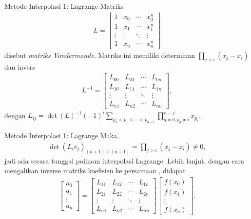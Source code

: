 \documentclass[xcolor={dvipsnames}, 9pt]{beamer}
\begin{document}
    \begin{frame}{Metode Interpolasi 1: Lagrange}
        Matriks
        \begin{align*}
            L =
            \begin{bmatrix}
                1 & x_0 & \cdots & x_0^n \\
                1 & x_1 & \cdots & x_1^n \\
                \vdots & \vdots & \ddots & \vdots \\
                1 & x_n & \cdots & x_n^n
            \end{bmatrix}
        \end{align*}
        disebut \emph{matriks Vandermonde}. Matriks ini memiliki determinan $\prod_{j>i}(x_j-x_i)$ dan invers
        \begin{align*}
            L^{-1} =  
            \begin{bmatrix}
                L_{00} & L_{01} & \cdots & L_{0n} \\
                L_{10} & L_{11} & \cdots & L_{1n} \\
                \vdots & \vdots & \ddots & \vdots \\
                L_{n1} & L_{n2} & \cdots & L_{nn}
            \end{bmatrix},
        \end{align*}
        dengan $L_{ij} = \det(L)^{-1}(-1)^{i}\sum_{p_0<p_1<\cdots<p_{n-i}}\prod_{q=0,p_q\neq i}^{n-j}x_{p_i}$.
    \end{frame}
    \begin{frame}{Metode Interpolasi 1: Lagrange}
        Maka,
        \begin{align*}
            \det(L_iv_j)_{(n+1)\times(n+1)} = \prod_{j>i}(x_j-x_i)\neq 0,
        \end{align*}
        jadi ada secara tunggal polinom interpolasi Lagrange. Lebih lanjut, dengan cara mengalikan inverse matriks koefisien ke persamaan \theequation, didapat
        \begin{align*}
            \begin{bmatrix}
                a_0 \\ a_1 \\ \vdots \\ a_n
            \end{bmatrix} = 
            \begin{bmatrix}
                L_{11} & L_{12} & \cdots & L_{1n} \\
                L_{21} & L_{22} & \cdots & L_{2n} \\
                \vdots & \vdots & \ddots & \vdots \\
                L_{n1} & L_{n2} & \cdots & L_{nn}
            \end{bmatrix}
            \begin{bmatrix}
                f(x_0) \\ f(x_1) \\ \vdots \\ f(x_n)
            \end{bmatrix}.
        \end{align*}
    \end{frame}
\end{document}
